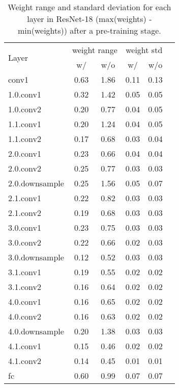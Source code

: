 \documentclass[10pt,twocolumn,letterpaper]{article}
\begin{document}
\begin{table}[t]
\caption{Weight range and standard deviation for each layer in ResNet-18 (max(weights) - min(weights)) after a pre-training stage.} \label{table_resnet_dist}
\vskip 0.15in
\begin{center}
\begin{small}
\begin{sc}
\begin{tabular}{lccccc}
\toprule
\multirow{2}{*}{Layer} & \multicolumn{2}{c}{weight range} & \multicolumn{2}{c}{weight std}\\
 & w/  & w/o  & w/  & w/o \\
\midrule
conv1 &  0.63 & 1.86 & 0.11 & 0.13\\
1.0.conv1 &   0.32 & 1.42 & 0.05 & 0.05 \\
1.0.conv2 &   0.20 & 0.77 & 0.04 & 0.05 \\
1.1.conv1 &   0.20 & 1.24 & 0.04 & 0.05 \\
1.1.conv2 &   0.17 & 0.68 & 0.03 & 0.04 \\
2.0.conv1 &   0.23 & 0.66 & 0.04 & 0.04 \\
2.0.conv2 &   0.25 & 0.77 & 0.03 & 0.03 \\
2.0.downsample &   0.25 & 1.56 & 0.05 & 0.07 \\
2.1.conv1 &   0.22 & 0.82 & 0.03 & 0.03 \\
2.1.conv2 &   0.19 & 0.68 & 0.03 & 0.03 \\
3.0.conv1 &   0.23 & 0.75 & 0.03 & 0.03 \\
3.0.conv2 &   0.22 & 0.66 & 0.02 & 0.03 \\
3.0.downsample &   0.12 & 0.52 & 0.03 & 0.03 \\
3.1.conv1 &   0.19 & 0.55 & 0.02 & 0.02 \\
3.1.conv2 &   0.16 & 0.64 & 0.02 & 0.02 \\
4.0.conv1 &   0.16 & 0.65 & 0.02 & 0.02 \\
4.0.conv2 &   0.16 & 0.63 & 0.02 & 0.02 \\
4.0.downsample &   0.20 & 1.38 & 0.03 & 0.03 \\
4.1.conv1 &   0.15 & 0.46 & 0.02 & 0.02 \\
4.1.conv2 &   0.14 & 0.45 & 0.01 & 0.01 \\
fc &   0.60 & 0.99 & 0.07 & 0.07 \\






\bottomrule
\end{tabular}
\end{sc}
\end{small}
\end{center}
\vskip -0.1in
\end{table}
\end{document}
